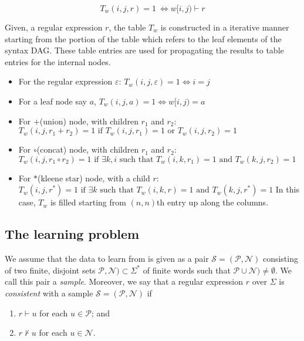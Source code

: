 $$T_w(i,j,r)=1\ \iff w[i,j)\vdash r $$


Given, a regular expression $r$, the table $T_{w}$ is constructed in a iterative manner starting from the portion of the table which refers to the leaf elements of the syntax DAG. These table entries are used for propagating the results to table entries for the internal nodes.\\
\noindent

\begin{itemize}[label=-]
\item For the regular expression $\varepsilon$:\hspace{2pt} $T_{w}(i,j,\varepsilon)=1 \iff i=j$

\item For a leaf node say $a$,\hspace{2pt} $T_{w}(i,j,a)=1 \iff w[i,j)=a$

\item For $+$(union) node, with children $r_1$ and $r_2$:\\$T_w(i,j,r_1+r_2)=1 \text{ if } T_{w}(i,j,r_1)=1 \text{ or } T_w(i,j,r_2)=1$

\item For $\circ$(concat) node, with children $r_1$ and $r_2$:\\$T_w(i,j,r_1\circ r_2)=1 \text{ if } \exists k, i \text{ such that }T_w(i,k,r_1)=1 \text{ and } T_w(k,j,r_2)=1$

\item For $*$(kleene star) node, with a child $r$:\\$T_w(i,j,r^*)=1 \text{ if } \exists k \text{ such that }T_w(i,k,r)=1 \text{ and } T_w(k,j,r^*)=1$
In this case, $T_w$ is filled starting from $(n,n)$th entry up along the columns. 
\end{itemize}
\subsection{The learning problem}
We assume that the data to learn from is given as a pair $\mathcal S = (\mathcal P, \mathcal N)$ consisting of two finite, disjoint sets $\mathcal P, \mathcal N) \subset \Sigma^\ast$ of finite words such that $\mathcal P \cup \mathcal N) \neq \emptyset$.
We call this pair a \emph{sample}.
Moreover, we say that a regular expression $r$ over $\Sigma$ is \emph{consistent} with a sample $\mathcal S = (\mathcal P,\mathcal N)$ if
\begin{enumerate}
	\item $r \vdash u$ for each $u \in \mathcal P$; and
	\item $r \nvdash u$ for each $u \in \mathcal N$.
\end{enumerate}

